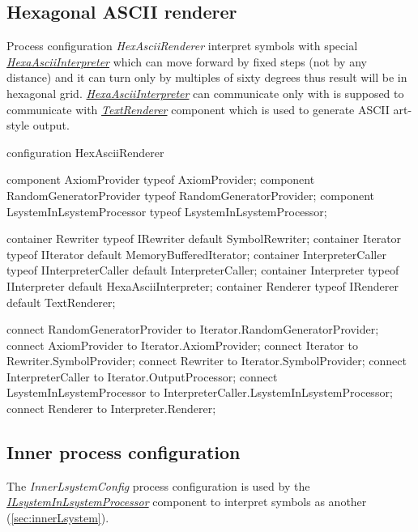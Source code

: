 \subsection{Hexagonal ASCII renderer}

Process configuration \emph{HexAsciiRenderer} interpret symbols with special \hyperref[Malsys.Processing.Components.Interpreters.HexaAsciiInterpreter]{\emph{HexaAsciiInterpreter}}
	which can move forward by fixed steps (not by any distance) and it can turn only by multiples of sixty degrees thus result will be in hexagonal grid.
\hyperref[Malsys.Processing.Components.Interpreters.HexaAsciiInterpreter]{\emph{HexaAsciiInterpreter}} can communicate only with  is supposed to communicate with
	\hyperref[Malsys.Processing.Components.Renderers.TextRenderer]{\emph{TextRenderer}} component which is used to generate ASCII art-style output.

\begin{LsystemBreak}
configuration HexAsciiRenderer {
	component AxiomProvider typeof AxiomProvider;
	component RandomGeneratorProvider
		typeof RandomGeneratorProvider;
	component LsystemInLsystemProcessor
		typeof LsystemInLsystemProcessor;

	container Rewriter typeof IRewriter default SymbolRewriter;
	container Iterator typeof IIterator
		default MemoryBufferedIterator;
	container InterpreterCaller typeof IInterpreterCaller
		default InterpreterCaller;
	container Interpreter typeof IInterpreter
		default HexaAsciiInterpreter;
	container Renderer typeof IRenderer default TextRenderer;

	connect RandomGeneratorProvider
		to Iterator.RandomGeneratorProvider;
	connect AxiomProvider to Iterator.AxiomProvider;
	connect Iterator to Rewriter.SymbolProvider;
	connect Rewriter to Iterator.SymbolProvider;
	connect InterpreterCaller to Iterator.OutputProcessor;
	connect LsystemInLsystemProcessor
		to InterpreterCaller.LsystemInLsystemProcessor;
	connect Renderer to Interpreter.Renderer;
}
\end{LsystemBreak}


\subsection{Inner \lsystem process configuration}
\label{sec:innerLsystemConfig}

The \emph{InnerLsystemConfig} process configuration is used by the \hyperref[Malsys.Processing.Components.Common.ILsystemInLsystemProcessor]{\emph{ILsystemInLsystemProcessor}}
	component to interpret symbols as another \lsystem (\ref{sec:innerLsystem}).

